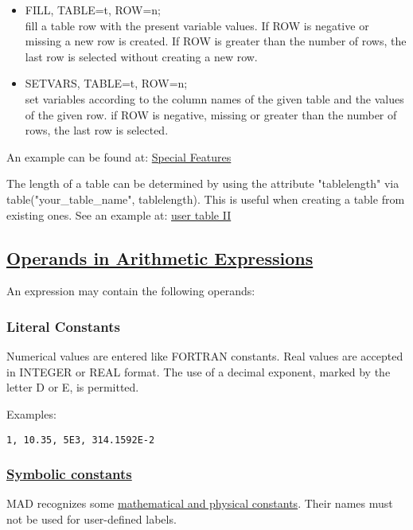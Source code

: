 \begin{itemize}
  \item  FILL, TABLE=t, ROW=n; \\
    fill a table row with the present variable values. If ROW is
    negative or missing a new row is created. If ROW is greater than the
    number of rows, the last row is selected without creating a new row.  

  \item SETVARS, TABLE=t, ROW=n; \\
    set variables according to the column names of the given table and
    the values of the given row. if ROW is negative, missing or greater
    than the number of rows, the last row is selected. 
\end{itemize}

An example can be found at:
\href{http://cern.ch/frs/mad-X_examples/special_features}{Special
  Features} 

The length of a table can be determined by using the attribute
"tablelength" via table("your\_table\_name", tablelength). This is
useful when creating a table from existing ones. See an example at:
\href{../Introduction/select.html#screate}{user table II} 


\subsection{\href{operand}{Operands in Arithmetic Expressions}} 
\label{subsec:operand}
An expression may contain the following operands:  

\subsubsection{Literal Constants} 
Numerical values are entered like FORTRAN constants. Real values are
accepted in INTEGER or REAL format. The use of a decimal exponent,
marked by the letter D or E, is permitted.  

Examples: 
\begin{verbatim}
1, 10.35, 5E3, 314.1592E-2
\end{verbatim}

\subsubsection{\href{constant}{Symbolic constants}} 
\label{subsubsec:symbolic_const}
MAD recognizes some \hyperlink{constant}{mathematical and physical
  constants}. Their names must not be used for user-defined labels.  

